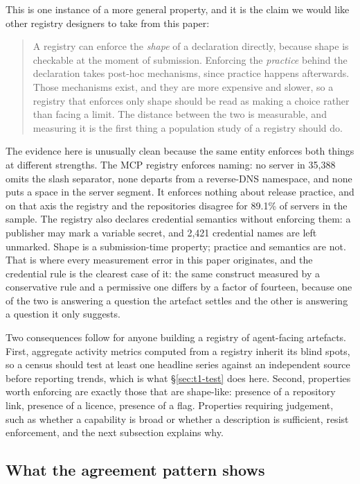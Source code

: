 \documentclass[a4paper,fleqn]{cas-dc}
\begin{document}
This is one instance of a more general property, and it is the claim we would
like other registry designers to take from this paper:

\begin{quote}
A registry can enforce the \emph{shape} of a declaration directly, because shape
is checkable at the moment of submission. Enforcing the \emph{practice} behind
the declaration takes post-hoc mechanisms, since practice happens afterwards.
Those mechanisms exist, and they are more expensive and slower, so a registry
that enforces only shape should be read as making a choice rather than facing a
limit. The distance between the two is measurable, and measuring it is the first
thing a population study of a registry should do.
\end{quote}

The evidence here is unusually clean because the same entity enforces both
things at different strengths. The MCP registry enforces naming: no server in
35,388 omits the slash separator, none departs from a reverse-DNS namespace, and
none puts a space in the server segment. It enforces nothing about release
practice, and on that axis the registry and the repositories disagree for 89.1\%
of servers in the sample. The registry also declares credential semantics
without enforcing them: a publisher may mark a variable secret, and 2,421
credential names are left unmarked. Shape is a submission-time
property; practice and semantics are not. That is where every measurement error
in this paper originates, and the credential rule is the clearest case of it:
the same construct measured by a conservative rule and a permissive one differs
by a factor of fourteen, because one of the two is answering a question the
artefact settles and the other is answering a question it only suggests.

Two consequences follow for anyone building a registry of agent-facing
artefacts. First, aggregate activity metrics computed from a registry inherit
its blind spots, so a census should test at least one headline series against an
independent source before reporting trends, which is what \S\ref{sec:t1-test}
does here. Second, properties worth enforcing are exactly those that are
shape-like: presence of a repository link, presence of a licence, presence of a
flag. Properties requiring judgement, such as whether a capability is broad or
whether a description is sufficient, resist enforcement, and the next
subsection explains why.

\subsection{What the agreement pattern shows}\label{sec:reliability-pattern}
\end{document}
